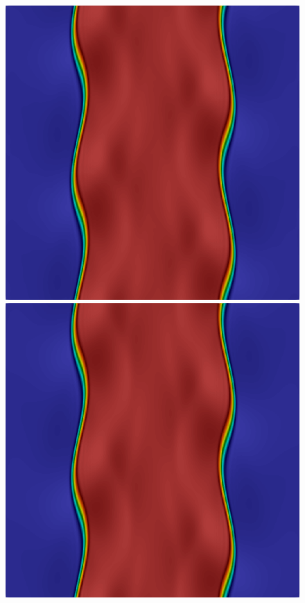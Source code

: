 \begin{figure}[h!]
\includegraphics[scale=0.115]{data/Compressible_Euler/KH/Snapshots/density_200_307.png}\hspace{1em}
\includegraphics[scale=0.115]{data/Compressible_Euler/KH/Snapshots/density_500_307.png}\hspace{1em}

\end{figure}
